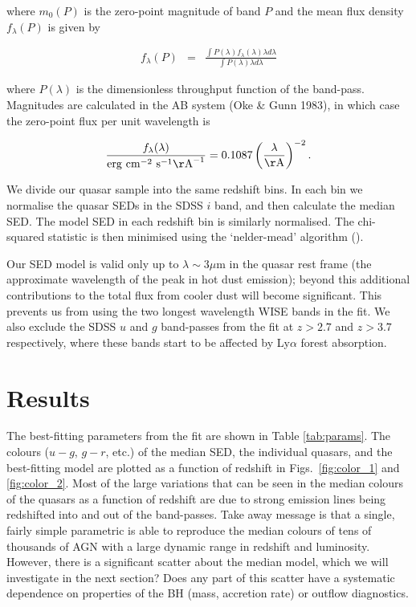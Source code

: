 where $m_0(P)$ is the zero-point magnitude of band $P$ and the mean flux density $f_{\lambda}(P)$ is given by 

\begin{eqnarray}
  \label{eq:flux}
  f_{\lambda}(P) & = & \frac{\int P(\lambda) f_\lambda(\lambda) \lambda d\lambda }{\int P(\lambda) \lambda d\lambda}
\end{eqnarray}

where $P(\lambda)$ is the dimensionless throughput function of the band-pass. 
Magnitudes are calculated in the AB system (Oke \& Gunn 1983), in which case the zero-point flux per unit wavelength is 

\begin{eqnarray}
  \frac{f_\lambda(\lambda)}{{\rm erg}~{\rm cm}^{-2}~{\rm s}^{-1} {\rm\AA}^{-1}} = 0.1087 \left(\frac{\lambda}{\rm \AA}\right)^{-2}.
\end{eqnarray}


We divide our quasar sample into the same redshift bins.
In each bin we normalise the quasar SEDs in the SDSS $i$ band, and then calculate the median SED. 
The model SED in each redshift bin is similarly normalised. 
The chi-squared statistic is then minimised using the `nelder-mead' algorithm (). 

Our SED model is valid only up to $\lambda \sim 3\mu$m in the quasar rest frame (the approximate wavelength of the peak in hot dust emission); beyond this additional contributions to the total flux from cooler dust will become significant. 
This prevents us from using the two longest wavelength WISE bands in the fit. 
We also exclude the SDSS $u$ and $g$ band-passes from the fit at $z > 2.7$ and $z > 3.7$ respectively, where these bands start to be affected by Ly$\alpha$ forest absorption.

\section{Results}

The best-fitting parameters from the fit are shown in Table \ref{tab:params}. 
The colours ($u - g$, $g - r$, etc.) of the median SED, the individual quasars, and the best-fitting model are plotted as a function of redshift in Figs.~\ref{fig:color_1} and \ref{fig:color_2}.
Most of the large variations that can be seen in the median colours of the quasars as a function of redshift are due to strong emission lines being redshifted into and out of the band-passes.
Take away message is that a single, fairly simple parametric is able to reproduce the median colours of tens of thousands of AGN with a large dynamic range in redshift and luminosity. 
However, there is a significant scatter about the median model, which we will investigate in the next section?
Does any part of this scatter have a systematic dependence on properties of the BH (mass, accretion rate) or outflow diagnostics.  

